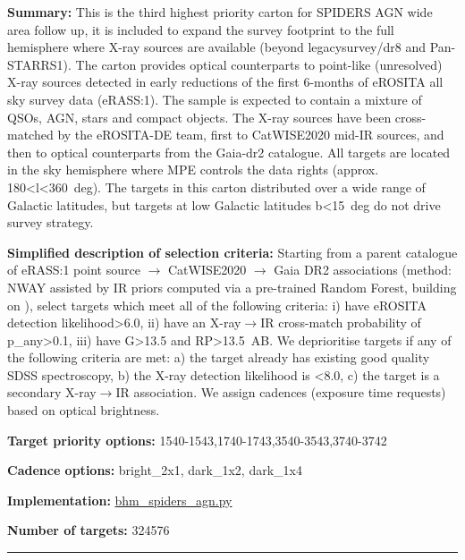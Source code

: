 \noindent\textbf{Summary:} This is the third highest priority carton for SPIDERS
AGN wide area follow up, it is included to expand the survey footprint
to the full hemisphere where X-ray sources are available (beyond
legacysurvey/dr8 and Pan-STARRS1). The carton provides optical
counterparts to point-like (unresolved) X-ray sources detected in early
reductions of the first 6-months of eROSITA all sky survey data
(eRASS:1). The sample is expected to contain a mixture of QSOs, AGN,
stars and compact objects. The X-ray sources have been cross-matched by
the eROSITA-DE team, first to
CatWISE2020 \citep{Marocco2021}
mid-IR sources, and then to optical counterparts from the Gaia-dr2
catalogue. All targets are located in the sky hemisphere where MPE
controls the data rights (approx. 180\textless l\textless360~deg). The
targets in this carton distributed over a wide range of Galactic
latitudes, but targets at low Galactic latitudes
\textbar b\textbar\textless15~deg do not drive survey strategy.

\noindent\textbf{Simplified description of selection criteria:} Starting from a
parent catalogue of eRASS:1 point source $\rightarrow$ CatWISE2020 $\rightarrow$ Gaia DR2
associations (method: NWAY assisted by IR priors computed via a
pre-trained Random Forest, building on
\citealt{Salvato2022}), select targets which meet all of the following criteria:
i) have eROSITA detection likelihood\textgreater6.0, ii) have an
X-ray$\rightarrow$IR cross-match probability of p\_any\textgreater0.1, iii) have
G\textgreater13.5 and RP\textgreater13.5~AB. We deprioritise targets if
any of the following criteria are met: a) the target already has
existing good quality SDSS spectroscopy, b) the X-ray detection
likelihood is \textless8.0, c) the target is a secondary X-ray$\rightarrow$IR
association. We assign cadences (exposure time requests) based on
optical brightness.


\noindent\textbf{Target priority options:}
1540-1543,1740-1743,3540-3543,3740-3742

\noindent\textbf{Cadence options:} bright\_2x1, dark\_1x2, dark\_1x4

\noindent\textbf{Implementation:}
\href{https://github.com/sdss/target_selection/blob/0.3.0/python/target_selection/cartons/bhm_spiders_agn.py}{bhm\_spiders\_agn.py}

\noindent\textbf{Number of targets:} 324576

\begin{center}\rule{0.5\linewidth}{0.5pt}\end{center}

